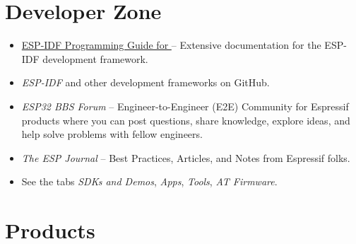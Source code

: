 {\begin{minipage}{\textwidth}
\section*{Developer Zone}

\begin{itemize}
  \ifcsname linkidfprogguideEN\endcsname%
    \item \href{\linkprefix\linkidfprogguideEN}{ESP-IDF Programming Guide for \chipseries{}} --
        {\small Extensive documentation for the ESP-IDF development framework.}
  \fi%

    \item \textit{ESP-IDF} and other development frameworks on GitHub.\\
        \href{\linkprefix\linkgithub}{\linkprefix\linkgithub}

    \item \textit{ESP32 BBS Forum} --
        {\small Engineer-to-Engineer (E2E) Community for Espressif products where you can post questions, share knowledge, explore ideas, and help solve problems with fellow engineers.}\\
        \href{\linkprefix\linkespforum}{\linkprefix\linkespforum}
        
    \item \textit{The ESP Journal} --
        {\small Best Practices, Articles, and Notes from Espressif folks.}\\
        \href{\linkprefix\linkespjournal}{\linkprefix\linkespjournal}

    \item See the tabs \textit{SDKs and Demos}, \textit{Apps}, \textit{Tools}, \textit{AT Firmware}.\\
        \href{\linkprefix\linksdkdemoEN}{\linkprefix\linksdkdemoEN}
\end{itemize}

\end{minipage}



\begin{minipage}{\textwidth}

\section*{Products}


\end{minipage}}
